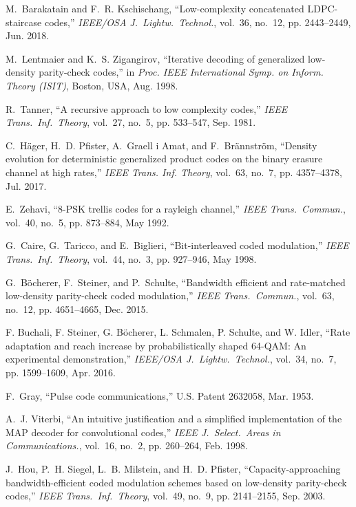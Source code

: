 \documentclass[journal]{IEEEtran}
\begin{document}
\begin{thebibliography}{10}
	M.~Barakatain and F.~R. Kschischang, ``Low-complexity concatenated
	{LDPC}-staircase codes,'' \emph{IEEE/OSA J.\ Lightw.\ Technol.}, vol.~36,
	no.~12, pp. 2443--2449, Jun. 2018.
	
	M.~Lentmaier and K.~S. Zigangirov, ``Iterative decoding of generalized
	low-density parity-check codes,'' in \emph{Proc. IEEE International Symp. on
		Inform. Theory (ISIT)}, Boston, USA, Aug. 1998.
	
	R.~{Tanner}, ``A recursive approach to low complexity codes,'' \emph{IEEE
		Trans.\ Inf.\ Theory}, vol.~27, no.~5, pp. 533--547, Sep. 1981.
	
	C.~H{\"{a}}ger, H.~D. Pfister, A.~{Graell i Amat}, and
	F.~Br{\"{a}}nnstr{\"{o}}m, ``Density evolution for deterministic generalized
	product codes on the binary erasure channel at high rates,'' \emph{IEEE
		Trans. Inf. Theory}, vol.~63, no.~7, pp. 4357--4378, Jul. 2017.
	
	E.~{Zehavi}, ``8-{PSK} trellis codes for a rayleigh channel,'' \emph{IEEE
		Trans.\ Commun.}, vol.~40, no.~5, pp. 873--884, May 1992.
	
	G.~{Caire}, G.~{Taricco}, and E.~{Biglieri}, ``Bit-interleaved coded
	modulation,'' \emph{IEEE Trans.\ Inf.\ Theory}, vol.~44, no.~3, pp. 927--946,
	May 1998.
	
	G.~B\"ocherer, F.~Steiner, and P.~Schulte, ``Bandwidth efficient and
	rate-matched low-density parity-check coded modulation,'' \emph{IEEE Trans.\
		Commun.}, vol.~63, no.~12, pp. 4651--4665, Dec. 2015.
	
	{F. Buchali}, {F. Steiner}, {G. B\"ocherer}, {L. Schmalen}, {P. Schulte}, and
	{W. Idler}, ``Rate adaptation and reach increase by probabilistically shaped
	64-{QAM}: An experimental demonstration,'' \emph{IEEE/OSA J.\ Lightw.\
		Technol.}, vol.~34, no.~7, pp. 1599--1609, Apr. 2016.
	
	F.~{Gray}, ``Pulse code communications,'' U.S. Patent 2632058, Mar. 1953.
	
	\bibitem{Viterbi1998}
	A.~J. {Viterbi}, ``An intuitive justification and a simplified implementation
	of the {MAP} decoder for convolutional codes,'' \emph{IEEE J.\ Select.\ Areas
		in Communications.}, vol.~16, no.~2, pp. 260--264, Feb. 1998.
	
	J.~{Hou}, P.~H. {Siegel}, L.~B. {Milstein}, and H.~D. {Pfister},
	``Capacity-approaching bandwidth-efficient coded modulation schemes based on
	low-density parity-check codes,'' \emph{IEEE Trans.\ Inf.\ Theory}, vol.~49,
	no.~9, pp. 2141--2155, Sep. 2003.
	

\end{thebibliography}
\end{document}
